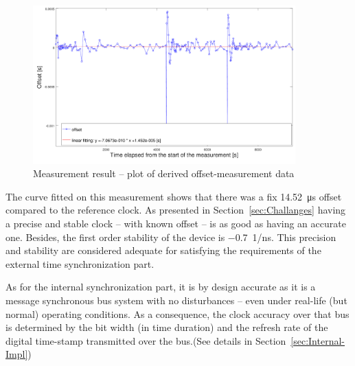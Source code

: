 \documentclass[journal]{IEEEtran}
\begin{document}
\begin{figure}[!htb]
    \centering
    \includegraphics[width=0.9\textwidth]{figures_raw/plot2.png}
    \caption{Measurement result -- plot of derived offset-measurement data}
    \label{fig:results}
\end{figure}

The curve fitted on this measurement shows that there was a fix \SI{14.52}{\micro\second} offset compared to the
reference clock. As presented in Section~\ref{sec:Challanges}
having a precise and stable clock -- with known offset -- is as good as having an accurate one. Besides,
the first order stability of the
device is \SI{-0.7}{1/\nano\second}. This precision and stability are considered adequate for satisfying the
requirements of the external time synchronization part.

As for the internal synchronization part, it is by design accurate as it is a message synchronous bus system with no
disturbances -- even under real-life (but normal) operating conditions. As a
consequence, the clock accuracy over that bus is determined by the bit width (in time duration) and the refresh rate of the digital
time-stamp transmitted over the bus.(See details in Section~\ref{sec:Internal-Impl})

%
\end{document}
